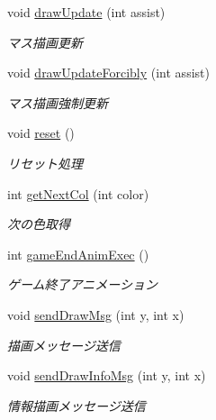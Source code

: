 \begin{DoxyCompactItemize}
void \hyperlink{class_reversi4color_wpf_1_1_reversi_play_af579d0b931ddc4bb8e07f37254e08625}{draw\+Update} (int assist)
\begin{DoxyCompactList}\small\item\em マス描画更新 \end{DoxyCompactList}\item 
void \hyperlink{class_reversi4color_wpf_1_1_reversi_play_a4669f078f21525854defe55a689fe2de}{draw\+Update\+Forcibly} (int assist)
\begin{DoxyCompactList}\small\item\em マス描画強制更新 \end{DoxyCompactList}\item 
void \hyperlink{class_reversi4color_wpf_1_1_reversi_play_a37fb774e5829a4dd99d9af0ca020f912}{reset} ()
\begin{DoxyCompactList}\small\item\em リセット処理 \end{DoxyCompactList}\item 
int \hyperlink{class_reversi4color_wpf_1_1_reversi_play_a5ad5b6251ce357ddfe1540c5559b9371}{get\+Next\+Col} (int color)
\begin{DoxyCompactList}\small\item\em 次の色取得 \end{DoxyCompactList}\item 
int \hyperlink{class_reversi4color_wpf_1_1_reversi_play_a11c4713ab8ff3fde4ebf7b0ab6cc7ed3}{game\+End\+Anim\+Exec} ()
\begin{DoxyCompactList}\small\item\em ゲーム終了アニメーション \end{DoxyCompactList}\item 
void \hyperlink{class_reversi4color_wpf_1_1_reversi_play_a31094f14117da5411e4616e7935ff67b}{send\+Draw\+Msg} (int y, int x)
\begin{DoxyCompactList}\small\item\em 描画メッセージ送信 \end{DoxyCompactList}\item 
void \hyperlink{class_reversi4color_wpf_1_1_reversi_play_a503f1a56ac7547ebfb347c31ff5b7e15}{send\+Draw\+Info\+Msg} (int y, int x)
\begin{DoxyCompactList}\small\item\em 情報描画メッセージ送信 \end{DoxyCompactList}\end{DoxyCompactItemize}

